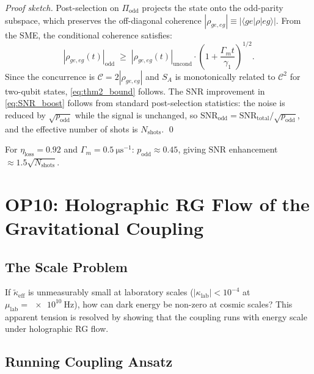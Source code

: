 \documentclass[12pt,a4paper]{article}
\theoremstyle{monette}
\theoremstyle{definition}
\newcommand{\SA}{S_A}
\newcommand{\keff}{\tilde{\kappa}_{\mathrm{eff}}}
\newcommand{\gamone}{\gamma_1}
\newcommand{\mulab}{\mu_{\mathrm{lab}}}
\newcommand{\klab}{\kappa_{\mathrm{lab}}}
\begin{document}
\begin{proof}[Proof sketch]
Post-selection on $\Pi_{\mathrm{odd}}$ projects the state onto the odd-parity
subspace, which preserves the off-diagonal coherence
$|\rho_{ge,eg}| \equiv |\langle ge|\rho|eg\rangle|$.
From the SME, the conditional coherence satisfies:
\begin{equation}
  |\rho_{ge,eg}(t)|_{\mathrm{odd}}
  \;\geq\;
  |\rho_{ge,eg}(t)|_{\mathrm{uncond}}
    \cdot\left(1 + \frac{\Gamma_m t}{\gamone}\right)^{1/2}.
  \label{eq:coherence_boost}
\end{equation}
Since the concurrence is $\mathcal{C} = 2|\rho_{ge,eg}|$ and $\SA$
is monotonically related to $\mathcal{C}^2$ for two-qubit states,
\cref{eq:thm2_bound} follows. The SNR improvement in \cref{eq:SNR_boost}
follows from standard post-selection statistics: the noise is reduced
by $\sqrt{p_{\mathrm{odd}}}$ while the signal is unchanged, so
$\mathrm{SNR}_{\mathrm{odd}} = \mathrm{SNR}_{\mathrm{total}}/\sqrt{p_{\mathrm{odd}}}$,
and the effective number of shots is $N_{\mathrm{shots}}$.
\qed
\end{proof}

For $\eta_{\mathrm{loss}} = 0.92$ and $\Gamma_m = \SI{0.5}{\micro\second^{-1}}$:
$p_{\mathrm{odd}} \approx 0.45$, giving
$\mathrm{SNR}$ enhancement $\approx 1.5\sqrt{N_{\mathrm{shots}}}$.

\section{OP10: Holographic RG Flow of the Gravitational Coupling}
\label{sec:op10}

\subsection{The Scale Problem}

If $\keff$ is unmeasurably small at laboratory scales
($|\klab| < 10^{-4}$ at $\mulab = \SI{e10}{\hertz}$), how can
dark energy be non-zero at cosmic scales?
This apparent tension is resolved by showing that the coupling runs
with energy scale under holographic RG flow.

\subsection{Running Coupling Ansatz}
\label{sec:running}
\end{document}
